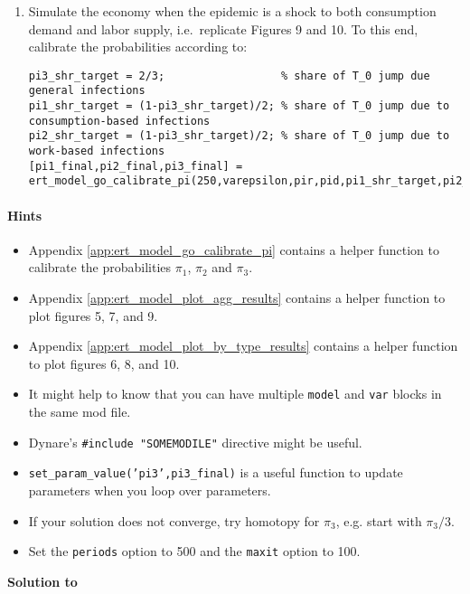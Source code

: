 \begin{enumerate}
\item Simulate the economy when the epidemic is a shock to both consumption demand and labor supply,
  i.e.\ replicate Figures 9 and 10.
To this end, calibrate the probabilities according to:

{\footnotesize
\begin{lstlisting}[style=Matlab-editor,basicstyle=\mlttfamily\scriptsize]
pi3_shr_target = 2/3;                  % share of T_0 jump due general infections
pi1_shr_target = (1-pi3_shr_target)/2; % share of T_0 jump due to consumption-based infections
pi2_shr_target = (1-pi3_shr_target)/2; % share of T_0 jump due to work-based infections
[pi1_final,pi2_final,pi3_final] = ert_model_go_calibrate_pi(250,varepsilon,pir,pid,pi1_shr_target,pi2_shr_target,RplusD_target,c_ss,n_ss);
\end{lstlisting}
}
    
\end{enumerate}


\paragraph{Hints}

\begin{itemize}

\item Appendix \ref{app:ert_model_go_calibrate_pi} contains a helper function to calibrate the probabilities $\pi_1$, $\pi_2$ and $\pi_3$.
    
\item Appendix \ref{app:ert_model_plot_agg_results} contains a helper function to plot figures 5, 7, and 9.

\item Appendix \ref{app:ert_model_plot_by_type_results} contains a helper function to plot figures 6, 8, and 10.

\item It might help to know that you can have multiple \texttt{model} and \texttt{var} blocks in the same mod file.

\item Dynare's \texttt{\@\#include "SOMEMODILE"} directive might be useful.

\item \texttt{set\_param\_value('pi3',pi3\_final)} is a useful function to update parameters when you loop over parameters.

\item If your solution does not converge, try homotopy for $\pi_3$, e.g. start with $\pi_3/3$.

\item Set the \texttt{periods} option to 500 and the \texttt{maxit} option to 100.

\end{itemize}


\begin{solution}\textbf{Solution to }
\ifDisplaySolutions

\fi
\newpage
\end{solution}